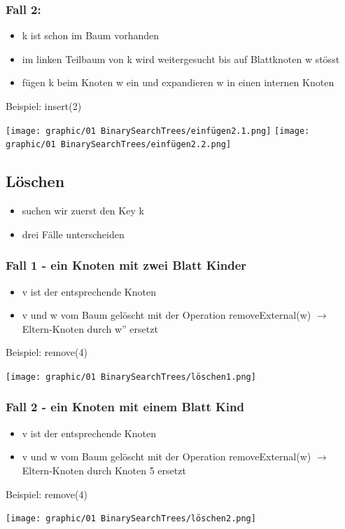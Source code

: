 \subsubsection{Fall 2:}
\begin{itemize}
    \item k ist schon im Baum vorhanden
    \item im linken Teilbaum von k wird weitergesucht bis auf Blattknoten w stösst
    \item fügen k beim Knoten w ein und expandieren w in einen internen Knoten
\end{itemize}
Beispiel: insert(2)
\vspace{-8pt}
\begin{multicols}{2}
    \texttt{[image: graphic/01 BinarySearchTrees/einfügen2.1.png]}
    \texttt{[image: graphic/01 BinarySearchTrees/einfügen2.2.png]}
\end{multicols}
\vspace{-8pt}

\subsection{Löschen}
\begin{itemize}
    \item suchen wir zuerst den Key k
    \item drei Fälle unterscheiden
\end{itemize}
\subsubsection{Fall 1 - ein Knoten mit zwei Blatt Kinder}
\begin{itemize}
    \item v ist der entsprechende Knoten
    \item v und w vom Baum gelöscht mit der Operation removeExternal(w) $\rightarrow$ Eltern-Knoten durch w'' ersetzt
\end{itemize}
Beispiel: remove(4)
\vspace{-8pt}
\begin{center}
    \texttt{[image: graphic/01 BinarySearchTrees/löschen1.png]}
\end{center}
\vspace{-8pt}

\subsubsection{Fall 2 - ein Knoten mit einem Blatt Kind}
\begin{itemize}
    \item v ist der entsprechende Knoten
    \item v und w vom Baum gelöscht mit der Operation removeExternal(w) $\rightarrow$ Eltern-Knoten durch Knoten 5 ersetzt
\end{itemize}
Beispiel: remove(4)
\vspace{-8pt}
\begin{center}
    \texttt{[image: graphic/01 BinarySearchTrees/löschen2.png]}
\end{center}
\vspace{-8pt}

